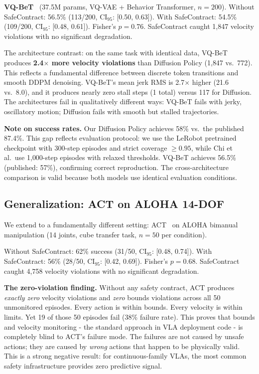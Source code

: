 \documentclass[conference]{IEEEtran}
\begin{document}
\textbf{VQ-BeT}~\cite{vqbet} (37.5M params, VQ-VAE + Behavior Transformer, $n{=}200$).
Without SafeContract: 56.5\% (113/200, CI$_{95}$: [0.50, 0.63]).
With SafeContract: 54.5\% (109/200, CI$_{95}$: [0.48, 0.61]).
Fisher's $p = 0.76$.
SafeContract caught 1{,}847 velocity violations with no significant degradation.

The architecture contrast: on the same task with identical data, VQ-BeT produces \textbf{2.4$\times$ more velocity violations} than Diffusion Policy (1{,}847 vs.\ 772).
This reflects a fundamental difference between discrete token transitions and smooth DDPM denoising.
VQ-BeT's mean jerk RMS is 2.7$\times$ higher (21.6 vs.\ 8.0), and it produces nearly zero stall steps (1 total) versus 117 for Diffusion.
The architectures fail in qualitatively different ways: VQ-BeT fails with jerky, oscillatory motion; Diffusion fails with smooth but stalled trajectories.

\textbf{Note on success rates.}
Our Diffusion Policy achieves 58\% vs.\ the published 87.4\%.
This gap reflects evaluation protocol: we use the LeRobot pretrained checkpoint with 300-step episodes and strict coverage $\ge 0.95$, while Chi et al.\ use 1{,}000-step episodes with relaxed thresholds.
VQ-BeT achieves 56.5\% (published: 57\%), confirming correct reproduction.
The cross-architecture comparison is valid because both models use identical evaluation conditions.

\subsection{Generalization: ACT on ALOHA 14-DOF}
\label{sec:aloha}

We extend to a fundamentally different setting: ACT~\cite{act} on ALOHA bimanual manipulation (14 joints, cube transfer task, $n{=}50$ per condition).

Without SafeContract: 62\% success (31/50, CI$_{95}$: [0.48, 0.74]).
With SafeContract: 56\% (28/50, CI$_{95}$: [0.42, 0.69]).
Fisher's $p = 0.68$.
SafeContract caught 4{,}758 velocity violations with no significant degradation.

\textbf{The zero-violation finding.}
Without any safety contract, ACT produces \emph{exactly zero} velocity violations and \emph{zero} bounds violations across all 50 unmonitored episodes.
Every action is within bounds. Every velocity is within limits.
Yet 19 of those 50 episodes fail (38\% failure rate).
This proves that bounds and velocity monitoring - the standard approach in VLA deployment code - is completely blind to ACT's failure mode.
The failures are not caused by unsafe actions; they are caused by \emph{wrong} actions that happen to be physically valid.
This is a strong negative result: for continuous-family VLAs, the most common safety infrastructure provides zero predictive signal.
\end{document}
